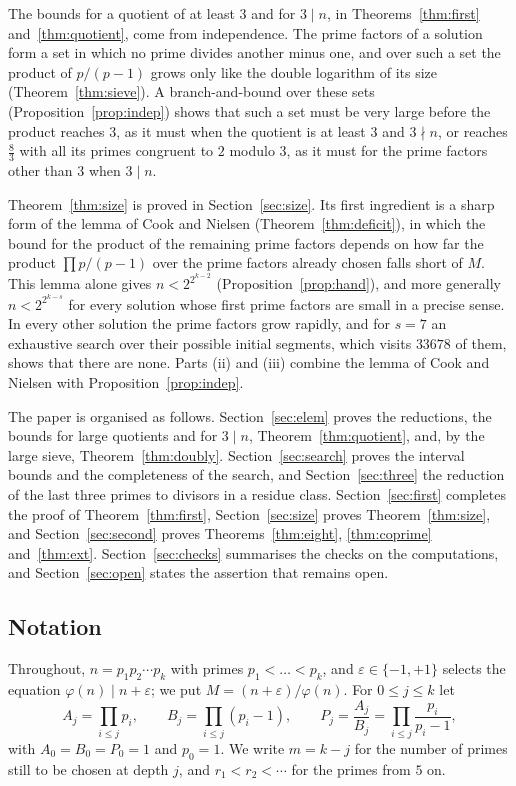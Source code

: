 \documentclass[screen,reqno]{aomart}
\numberwithin{equation}{section}
\theoremstyle{plain}
\theoremstyle{definition}
\theoremstyle{remark}
\begin{document}
The bounds for a quotient of at least $3$ and for $3\mid n$, in
Theorems~\ref{thm:first} and~\ref{thm:quotient}, come from
independence. The prime factors of a solution form a set in which no
prime divides another minus one, and over such a set the product of
$p/(p-1)$ grows only like the double logarithm of its size
(Theorem~\ref{thm:sieve}). A branch-and-bound over these sets
(Proposition~\ref{prop:indep}) shows that such a set must be very large
before the product reaches $3$, as it must when the quotient is at
least $3$ and $3\nmid n$, or reaches $\frac83$ with all its primes
congruent to $2$ modulo $3$, as it must for the prime factors other
than $3$ when $3\mid n$.

Theorem~\ref{thm:size} is proved in Section~\ref{sec:size}. Its first
ingredient is a sharp form of the lemma of Cook and Nielsen
(Theorem~\ref{thm:deficit}), in which the bound for the product of the
remaining prime factors depends on how far the product
$\prod p/(p-1)$ over the prime factors already chosen falls short of
$M$. This lemma alone gives $n<2^{2^{k-2}}$
(Proposition~\ref{prop:hand}), and more generally $n<2^{2^{k-s}}$ for
every solution whose first prime factors are small in a precise sense.
In every other solution the prime factors grow rapidly, and for $s=7$
an exhaustive search over their possible initial segments, which visits
$33678$ of them, shows that there are none. Parts (ii) and (iii)
combine the lemma of Cook and Nielsen with Proposition~\ref{prop:indep}.

The paper is organised as follows. Section~\ref{sec:elem} proves the
reductions, the bounds for large quotients and for $3\mid n$,
Theorem~\ref{thm:quotient}, and, by the large sieve,
Theorem~\ref{thm:doubly}. Section~\ref{sec:search} proves the interval
bounds and the completeness of the search, and
Section~\ref{sec:three} the reduction of the last three primes to
divisors in a residue class. Section~\ref{sec:first} completes the
proof of Theorem~\ref{thm:first}, Section~\ref{sec:size} proves
Theorem~\ref{thm:size}, and Section~\ref{sec:second} proves
Theorems~\ref{thm:eight}, \ref{thm:coprime} and~\ref{thm:ext}.
Section~\ref{sec:checks} summarises the checks on the computations,
and Section~\ref{sec:open} states the assertion that remains open.

\subsection*{Notation}
Throughout, $n=p_1p_2\cdots p_k$ with primes $p_1<\dots<p_k$, and
$\varepsilon\in\{-1,+1\}$ selects the equation
$\varphi(n)\mid n+\varepsilon$; we put $M=(n+\varepsilon)/\varphi(n)$.
For $0\le j\le k$ let
\[
  A_j=\prod_{i\le j}p_i,\qquad B_j=\prod_{i\le j}(p_i-1),\qquad
  P_j=\frac{A_j}{B_j}=\prod_{i\le j}\frac{p_i}{p_i-1},
\]
with $A_0=B_0=P_0=1$ and $p_0=1$. We write $m=k-j$ for the number of
primes still to be chosen at depth $j$, and
$r_1<r_2<\cdots$ for the primes from $5$ on.
\end{document}
